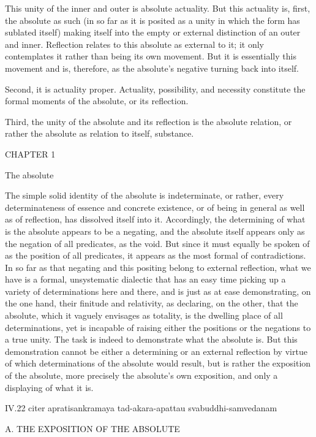 This unity of the inner and outer is absolute actuality.
But this actuality is, first, the absolute as such
(in so far as it is posited as a unity
in which the form has sublated itself)
making itself into the empty or external
distinction of an outer and inner.
Reflection relates to this absolute
as external to it;
it only contemplates it
rather than being its own movement.
But it is essentially this movement
and is, therefore, as the absolute's
negative turning back into itself.

Second, it is actuality proper.
Actuality, possibility, and necessity constitute
the formal moments of the absolute,
or its reflection.

Third, the unity of the absolute
and its reflection is
the absolute relation,
or rather the absolute as
relation to itself, substance.

CHAPTER 1

The absolute

The simple solid identity of the absolute is indeterminate,
or rather, every determinateness of essence and concrete existence,
or of being in general as well as of reflection,
has dissolved itself into it.
Accordingly, the determining of what is
the absolute appears to be a negating,
and the absolute itself appears only as
the negation of all predicates, as the void.
But since it must equally be spoken of
as the position of all predicates,
it appears as the most formal of contradictions.
In so far as that negating and this positing
belong to external reflection,
what we have is a formal, unsystematic dialectic
that has an easy time picking up
a variety of determinations here and there,
and is just as at ease demonstrating, on the one hand,
their finitude and relativity, as declaring, on the other,
that the absolute, which it vaguely envisages as totality,
is the dwelling place of all determinations,
yet is incapable of raising
either the positions or the negations
to a true unity.
The task is indeed to demonstrate what the absolute is.
But this demonstration cannot be either
a determining or an external reflection
by virtue of which determinations
of the absolute would result,
but is rather the exposition of the absolute,
more precisely the absolute's own exposition,
and only a displaying of what it is.

IV.22
citer apratisankramaya tad-akara-apattau svabuddhi-samvedanam

A. THE EXPOSITION OF THE ABSOLUTE

